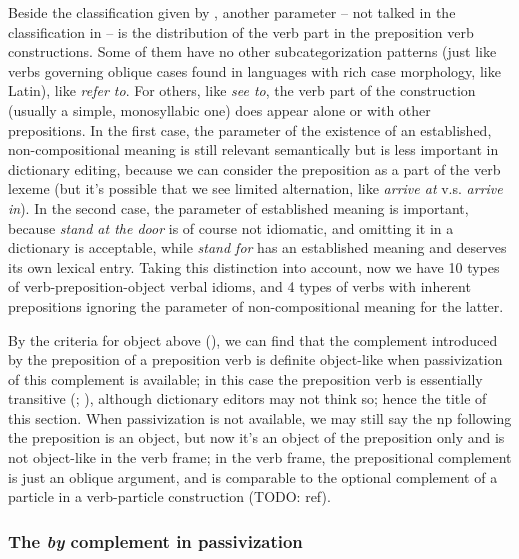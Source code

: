 \documentclass[UTF8, a4paper, oneside, scheme=plain, 12pt]{ctexbook}
\newcommand*{\citepage}[1]{p.~{#1}}
\newcommand{\form}[1]{\emph{#1}}
\begin{document}
Beside the classification given by ,
another parameter -- not talked in the classification in \citet{cgel}
-- is the distribution of the verb part in the preposition verb constructions.
Some of them
have no other subcategorization patterns
(just like verbs governing oblique cases found in languages with rich case morphology, like Latin),
like \form{refer to}.
For others, like \form{see to},
the verb part of the construction (usually a simple, monosyllabic one)
does appear alone or with other prepositions.
In the first case,
the parameter of the existence of an established, 
non-compositional meaning 
is still relevant semantically \citep[\citepage{291}]{dixon2005semantic} 
but is less important in dictionary editing,
because we can consider the preposition as a part of the verb lexeme
(but it's possible that we see limited alternation, 
like \form{arrive at} v.s. \form{arrive in}).
In the second case,
the parameter of established meaning is important,
because \form{stand at the door} is of course not idiomatic,
and omitting it in a dictionary is acceptable,
while \form{stand for} has an established meaning
and deserves its own lexical entry.
Taking this distinction into account, 
now we have 10 types of verb-preposition-object verbal idioms,
and 4 types of verbs with inherent prepositions 
ignoring the parameter of non-compositional meaning for the latter.

By the criteria for object above (),
we can find that the complement introduced by the preposition of a preposition verb 
is definite object-like
when passivization of this complement is available; 
in this case the preposition verb is essentially transitive
(\citealt[\citepage{291}, \citepage{297}]{dixon2005semantic};
\citealt[\citepage{277}]{cgel}),
although dictionary editors may not think so;
hence the title of this section.
When passivization is not available,
we may still say the \acs{np} following the preposition is an object,
but now it's an object of the preposition only 
and is not object-like in the verb frame;
in the verb frame,
the prepositional complement is just an oblique argument,
and is comparable to the optional complement 
of a particle in a verb-particle construction (TODO: ref). 

\subsubsection{The \form{by} complement in passivization}\label{sec:valency.overview.by-phrase}
\end{document}
